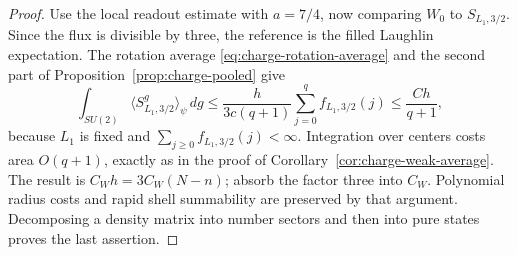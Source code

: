 \begin{proof}
Use the local readout estimate with $a=7/4$, now comparing
$W_0$ to $S_{L_1,3/2}$.  Since the flux is divisible by three,
the reference is the filled Laughlin expectation.
The rotation average \eqref{eq:charge-rotation-average} and the
second part of Proposition~\ref{prop:charge-pooled} give
\[
 \int_{SU(2)}\langle S_{L_1,3/2}^{g}\rangle_\psi\,dg
 \le\frac{h}{3c(q+1)}\sum_{j=0}^q f_{L_1,3/2}(j)
 \le\frac{C h}{q+1},
\]
because $L_1$ is fixed and $\sum_{j\ge0}f_{L_1,3/2}(j)<\infty$.
Integration over centers costs area $O(q+1)$, exactly as in the
proof of Corollary~\ref{cor:charge-weak-average}.  The result is
$C_Wh=3C_W(N-n)$; absorb the factor three into $C_W$.
Polynomial radius costs and rapid shell summability are preserved
by that argument.  Decomposing a density matrix into number
sectors and then into pure states proves the last assertion.
\end{proof}
